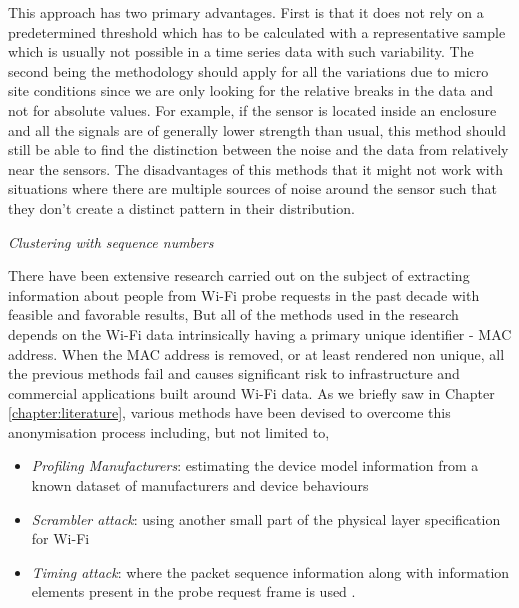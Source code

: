 This approach has two primary advantages. 
First is that it does not rely on a predetermined threshold which has to be calculated with a representative sample which is usually not possible in a time series data with such variability.
The second being the methodology should apply for all the variations due to micro site conditions since we are only looking for the relative breaks in the data and not for absolute values.
For example, if the sensor is located inside an enclosure and all the signals are of generally lower strength than usual, this method should still be able to find the distinction between the noise and the data from relatively near the sensors.
The disadvantages of this methods that it might not work with situations where there are multiple sources of noise around the sensor such that they don't create a distinct pattern in their distribution.

\vspace{1.5em}\noindent\textit{Clustering with sequence numbers}\vspace{0.5em}

There have been extensive research carried out on the subject of extracting information about people from Wi-Fi probe requests in the past decade with feasible and favorable results, 
But all of the methods used in the research depends on the Wi-Fi data intrinsically having a primary unique identifier - MAC address.
When the MAC address is removed, or at least rendered non unique, all the previous methods fail and causes significant risk to infrastructure and commercial applications built around Wi-Fi data.
As we briefly saw in Chapter \ref{chapter:literature}, various methods have been devised to overcome this anonymisation process including, but not limited to,
\begin{itemize}[rightmargin=2em, leftmargin=2em]
  \itemsep-0.25cm
  \item \textit{Profiling Manufacturers}: estimating the device model information from a known dataset of manufacturers and device behaviours \citep{martin2016}
  \item \textit{Scrambler attack}: using another small part of the physical layer specification for Wi-Fi \citep{vo2016, bloessl2015}
  \item \textit{Timing attack}: where the packet sequence information along with information elements present in the probe request frame is used \citep{matte2016, cheng2016}. 
\end{itemize}

